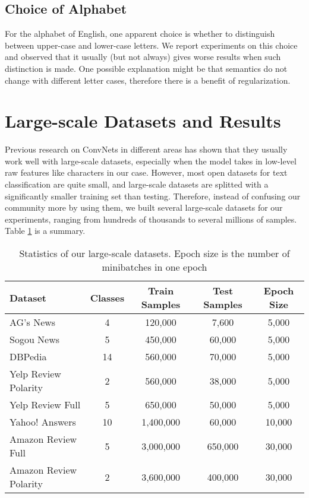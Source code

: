 \documentclass{article} \usepackage{nips15submit_e,times}
\begin{document}
\subsection{Choice of Alphabet}

For the alphabet of English, one apparent choice is whether to distinguish between upper-case and lower-case letters. We report experiments on this choice and observed that it usually (but not always) gives worse results when such distinction is made. One possible explanation might be that semantics do not change with different letter cases, therefore there is a benefit of regularization.

\section{Large-scale Datasets and Results}

Previous research on ConvNets in different areas has shown that they usually work well with large-scale datasets, especially when the model takes in low-level raw features like characters in our case. However, most open datasets for text classification are quite small, and large-scale datasets are splitted with a significantly smaller training set than testing\cite{LYRL04}. Therefore, instead of confusing our community more by using them, we built several large-scale datasets for our experiments, ranging from hundreds of thousands to several millions of samples. Table \ref{tab:data} is a summary.

\begin{table}[ht]
  \caption{Statistics of our large-scale datasets. Epoch size is the number of minibatches in one epoch}
  \label{tab:data}
  \begin{center}
    \begin{tabular}{lcccc}
      Dataset & Classes & Train Samples & Test Samples & Epoch Size \\
      \hline
      AG's News & 4 & 120,000 & 7,600 & 5,000 \\
      Sogou News & 5 & 450,000 & 60,000 & 5,000 \\
      DBPedia & 14 & 560,000 & 70,000 & 5,000 \\
      Yelp Review Polarity & 2 & 560,000 & 38,000 & 5,000 \\
      Yelp Review Full & 5 & 650,000 & 50,000 & 5,000 \\
      Yahoo! Answers & 10 & 1,400,000 & 60,000 & 10,000 \\
      Amazon Review Full & 5 & 3,000,000 & 650,000 & 30,000 \\
      Amazon Review Polarity & 2 & 3,600,000 & 400,000 & 30,000 \\
    \end{tabular}
  \end{center}
\end{table}
\end{document}
